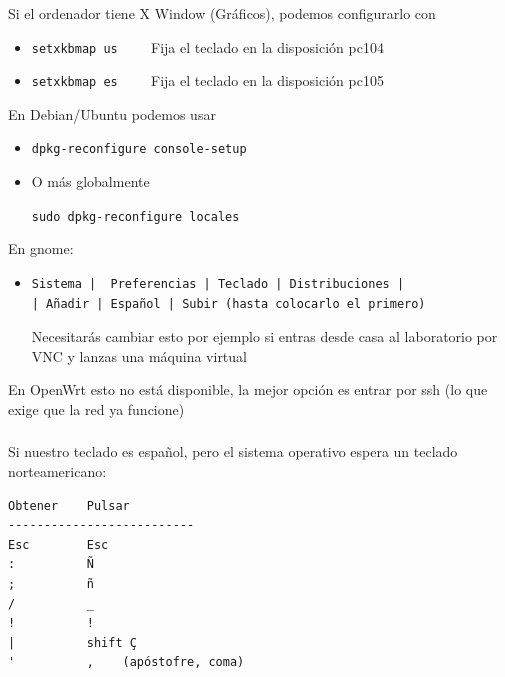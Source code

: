 \documentclass[ucs]{beamer}
\begin{document}
\begin{frame}[fragile]
\frametitle{}
Si el ordenador tiene X Window (Gráficos), podemos configurarlo con
\begin{itemize}
\item
\verb|setxkbmap us    | Fija el teclado en la disposición pc104
\item
\verb|setxkbmap es    | Fija el teclado en la disposición pc105
\end{itemize}


En Debian/Ubuntu podemos usar

\begin{itemize}
\item
\verb|dpkg-reconfigure console-setup|
\item
O más globalmente 

\verb|sudo dpkg-reconfigure locales|
\end{itemize}

En gnome:

\begin{itemize}
\item
  \begin{verbatim}
Sistema |  Preferencias | Teclado | Distribuciones | 
| Añadir | Español | Subir (hasta colocarlo el primero)
  \end{verbatim}

Necesitarás cambiar esto por ejemplo si entras desde casa
al laboratorio por VNC y lanzas una máquina virtual 
\end{itemize}

En OpenWrt esto no está disponible, la mejor opción es entrar por ssh (lo que exige que la red ya funcione)
\end{frame}





\begin{frame}[fragile]
\frametitle{}
Si nuestro teclado es español, pero el sistema operativo espera un teclado norteamericano:

  \begin{footnotesize}
  \begin{verbatim}
Obtener    Pulsar
--------------------------
Esc        Esc
:          Ñ
;          ñ
/          _
!          !
|          shift Ç
'          ,    (apóstofre, coma)
  \end{verbatim}
  \end{footnotesize}


\end{frame}
\end{document}
